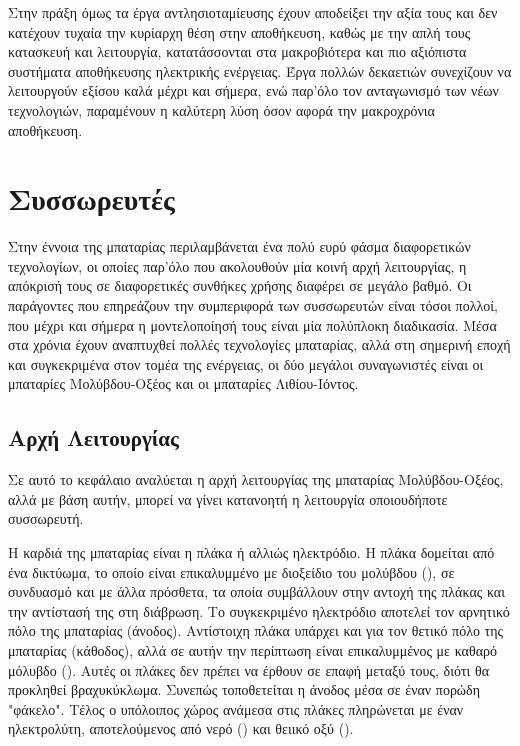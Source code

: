 \documentclass[12pt]{report}
\begin{document}
Στην πράξη όμως τα έργα αντλησιοταμίευσης έχουν αποδείξει την αξία τους και δεν κατέχουν τυχαία την κυρίαρχη θέση στην αποθήκευση, καθώς με την απλή τους κατασκευή και λειτουργία, 
κατατάσσονται στα μακροβιότερα και πιο αξιόπιστα συστήματα αποθήκευσης ηλεκτρικής ενέργειας. Έργα πολλών δεκαετιών συνεχίζουν να λειτουργούν εξίσου καλά μέχρι και σήμερα, ενώ παρ'όλο τον ανταγωνισμό των νέων τεχνολογιών,
παραμένουν η καλύτερη λύση όσον αφορά την μακροχρόνια αποθήκευση.
\vfill

\section{Συσσωρευτές}
Στην έννοια της μπαταρίας περιλαμβάνεται ένα πολύ ευρύ φάσμα διαφορετικών τεχνολογίων, οι οποίες παρ'όλο που ακολουθούν μία κοινή αρχή λειτουργίας, η απόκρισή τους σε διαφορετικές συνθήκες χρήσης διαφέρει σε μεγάλο βαθμό. 
Οι παράγοντες που επηρεάζουν την συμπεριφορά των συσσωρευτών είναι τόσοι πολλοί, που μέχρι και σήμερα η μοντελοποίησή τους είναι μία πολύπλοκη διαδικασία. Μέσα στα χρόνια έχουν αναπτυχθεί πολλές τεχνολογίες μπαταρίας, 
αλλά στη σημερινή εποχή και συγκεκριμένα στον τομέα της ενέργειας, οι δύο μεγάλοι συναγωνιστές είναι οι μπαταρίες Μολύβδου-Οξέος και οι μπαταρίες Λιθίου-Ιόντος.
\subsection{Αρχή Λειτουργίας}
Σε αυτό το κεφάλαιο αναλύεται η αρχή λειτουργίας της μπαταρίας Μολύβδου-Οξέος, αλλά με βάση αυτήν, μπορεί να γίνει κατανοητή η λειτουργία οποιουδήποτε συσσωρευτή. 

Η καρδιά της μπαταρίας είναι η πλάκα ή αλλιώς ηλεκτρόδιο.
Η πλάκα δομείται από ένα δικτύωμα, το οποίο είναι επικαλυμμένο με διοξείδιο του μολύβδου ({}), σε συνδυασμό και με άλλα πρόσθετα, τα οποία συμβάλλουν στην αντοχή της πλάκας και την αντίστασή της στη διάβρωση. 
Το συγκεκριμένο ηλεκτρόδιο αποτελεί τον αρνητικό πόλο της μπαταρίας (άνοδος). Αντίστοιχη πλάκα υπάρχει και για τον θετικό πόλο της μπαταρίας (κάθοδος), 
αλλά σε αυτήν την περίπτωση είναι επικαλυμμένος με καθαρό μόλυβδο ({}). Αυτές οι πλάκες δεν πρέπει να 
έρθουν σε επαφή μεταξύ τους, διότι θα προκληθεί βραχυκύκλωμα. Συνεπώς τοποθετείται η άνοδος μέσα σε έναν πορώδη "φάκελο". 
Τέλος ο υπόλοιπος χώρος ανάμεσα στις πλάκες πληρώνεται με έναν ηλεκτρολύτη, αποτελούμενος από νερό ({}) και θειικό οξύ ({}).
\end{document}

